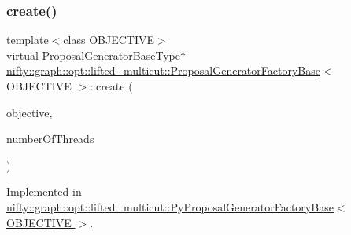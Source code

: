 \subsubsection{\texorpdfstring{create()}{create()}}
{\footnotesize\ttfamily template$<$class O\+B\+J\+E\+C\+T\+I\+VE$>$ \\
virtual \hyperlink{classnifty_1_1graph_1_1opt_1_1lifted__multicut_1_1ProposalGeneratorFactoryBase_ab201fe6397370621b50977e67ae55ace}{Proposal\+Generator\+Base\+Type}$\ast$ \hyperlink{classnifty_1_1graph_1_1opt_1_1lifted__multicut_1_1ProposalGeneratorFactoryBase}{nifty\+::graph\+::opt\+::lifted\+\_\+multicut\+::\+Proposal\+Generator\+Factory\+Base}$<$ O\+B\+J\+E\+C\+T\+I\+VE $>$\+::create (\begin{DoxyParamCaption}\item[{const \hyperlink{classnifty_1_1graph_1_1opt_1_1lifted__multicut_1_1ProposalGeneratorFactoryBase_a1986f0a3868e76ba5613f49ca4fc7dc6}{Objective\+Type} \&}]{objective,  }\item[{const size\+\_\+t}]{number\+Of\+Threads }\end{DoxyParamCaption})\hspace{0.3cm}{\ttfamily [pure virtual]}}



Implemented in \hyperlink{classnifty_1_1graph_1_1opt_1_1lifted__multicut_1_1PyProposalGeneratorFactoryBase_aa3041cdd0edf7e91144644a302f991bb}{nifty\+::graph\+::opt\+::lifted\+\_\+multicut\+::\+Py\+Proposal\+Generator\+Factory\+Base$<$ O\+B\+J\+E\+C\+T\+I\+V\+E $>$}.

\mbox{\label{classnifty_1_1graph_1_1opt_1_1lifted__multicut_1_1ProposalGeneratorFactoryBase_a8e4754d1fcb3bf3df9f6543daa88d50b}} 
